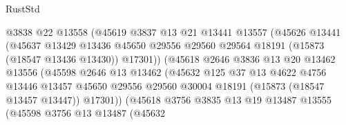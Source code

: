 \begin{lexlean}{RustStd}
\begin{coremodule}
                                @3838
                                @22
                                @13558
                                (@45619
                                  @3837
                                  @13
                                  @21
                                  @13441
                                  @13557
                                  (@45626
                                    @13441
                                    (@45637
                                      @13429
                                      @13436
                                      @45650
                                      @29556
                                      @29560
                                      @29564
                                      @18191
                                      (@15873 (@18547 @13436 @13430))
                                      @17301))
                                  (@45618
                                    @2646
                                    @3836
                                    @13
                                    @20
                                    @13462
                                    @13556
                                    (@45598
                                      @2646
                                      @13
                                      @13462
                                      (@45632
                                        @125
                                        @37
                                        @13
                                        @4622
                                        @4756
                                        @13446
                                        @13457
                                        @45650
                                        @29556
                                        @29560
                                        @30004
                                        @18191
                                        (@15873 (@18547 @13457 @13447))
                                        @17301))
                                    (@45618
                                      @3756
                                      @3835
                                      @13
                                      @19
                                      @13487
                                      @13555
                                      (@45598
                                        @3756
                                        @13
                                        @13487
                                        (@45632

\end{coremodule}
\end{lexlean}
